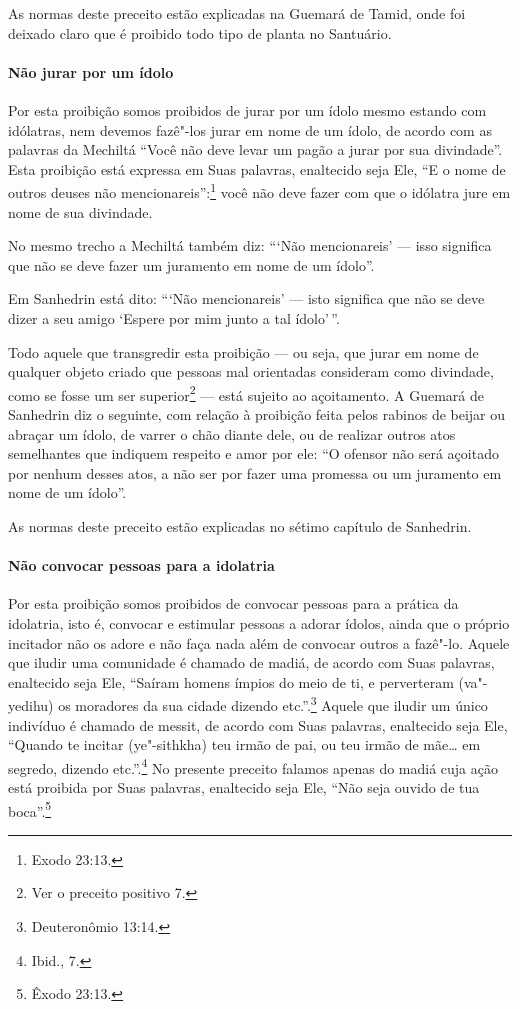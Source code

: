\begin{multicols}{2}
As normas deste preceito estão explicadas na Guemará\starr{} de Tamid\starr, onde foi
deixado claro que é proibido todo tipo de planta no Santuário.

\paragraph{Não jurar por um ídolo}

Por esta proibição somos proibidos de jurar por um ídolo mesmo estando
com idólatras, nem devemos fazê"-los jurar em nome de um ídolo, de acordo
com as palavras da Mechiltá\starr{} ``Você não deve levar um pagão a jurar por
sua divindade''. Esta proibição está expressa em Suas palavras,
enaltecido seja Ele, ``E o nome de outros deuses não mencionareis'':\footnote{Exodo 23:13.} você não deve fazer com que o idólatra jure em nome de
sua divindade.

No mesmo trecho a Mechiltá\starr{} também diz: ```Não mencionareis' --- isso
significa que não se deve fazer um juramento em nome de um ídolo''.

Em Sanhedrin\starr{} está dito: ```Não mencionareis' --- isto significa que não
se deve dizer a seu amigo `Espere por mim junto a tal ídolo'\,''.

Todo aquele que transgredir esta proibição --- ou seja, que jurar em
nome de qualquer objeto criado que pessoas mal orientadas consideram
como divindade, como se fosse um ser superior\footnote{Ver o preceito positivo 7.} ---
está sujeito ao açoitamento. A Guemará\starr{} de Sanhedrin\starr{} diz o seguinte, com
relação à proibição feita pelos rabinos de beijar ou abraçar um ídolo,
de varrer o chão diante dele, ou de realizar outros atos semelhantes que
indiquem respeito e amor por ele: ``O ofensor não será açoitado por
nenhum desses atos, a não ser por fazer uma promessa ou um juramento em
nome de um ídolo''.

As normas deste preceito estão explicadas no sétimo capítulo de Sanhedrin\starr.

\paragraph{Não convocar pessoas para a idolatria}

Por esta proibição somos proibidos de convocar pessoas para a prática
da idolatria, isto é, convocar e estimular pessoas a adorar ídolos,
ainda que o próprio incitador não os adore e não faça nada além de
convocar outros a fazê"-lo. Aquele que iludir uma comunidade é chamado de
madiá\starr, de acordo com Suas palavras, enaltecido seja Ele, ``Saíram
homens ímpios do meio de ti, e perverteram (va"-yedihu) os moradores da
sua cidade dizendo etc.''.\footnote{Deuteronômio 13:14.} Aquele que iludir um
único indivíduo é chamado de messit\starr, de acordo com Suas palavras,
enaltecido seja Ele, ``Quando te incitar (ye"-sithkha) teu irmão de pai,
ou teu irmão de mãe\ldots{} em segredo, dizendo etc.''.\footnote{Ibid., 7.} No
presente preceito falamos apenas do madiá\starr{} cuja ação está proibida
por Suas palavras, enaltecido seja Ele, ``Não seja ouvido de tua boca''.\footnote{Êxodo 23:13.}


\end{multicols}
